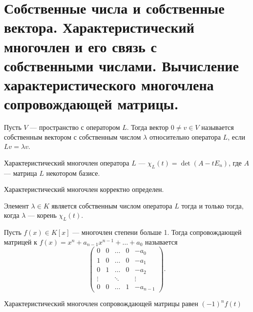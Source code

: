 \section{Собственные числа и собственные вектора. Характеристический многочлен и его связь с собственными числами. Вычисление характеристического многочлена сопровождающей матрицы.}
\begin{defn}
    Пусть $ V$ --- пространство с оператором $ L$. Тогда вектор  $ 0 \ne v \in V$ называется собственным вектором с собственным числом $ \lambda $ относительно оператора $ L$, если  $ Lv = \lambda v$.
\end{defn}
\begin{defn}
    {\sf Характеристический многочлен} оператора $ L$ ---  $ \chi _L(t) = \det (A - tE_n)$, где  $ A$ --- матрица  $ L$  некотором базисе.  
    \begin{note}
        Характеристический многочлен корректно определен.
    \end{note}
\end{defn}

\begin{st}
    Элемент $ \lambda \in K$ является собственным числом оператора $ L$  тогда и только тогда, когда $ \lambda $ --- корень $ \chi _L(t)$.
\end{st}
\begin{defn}
    Пусть $ f(x) \in  K[x]$ --- многочлен степени больше 1. Тогда {\sf сопровождающей матрицей} к $ f(x) = x^{n} + a_{n-1}x^{n-1} + \ldots + a_0$ называется
    \[
    \begin{pmatrix}
	0&0&\ldots &0&-a_0\\
	1&0&\ldots &0&-a_1\\
	0&1&\ldots &0&-a_2\\
	\vdots &&\ddots  &&\vdots\\
	0&0 &\ldots &1&-a_{n-1}
    \end{pmatrix}
    .\] 
\end{defn}
\begin{st}
    Характеристический многочлен сопровождающей матрицы равен $ (-1)^{n}f(t)$
\end{st}

